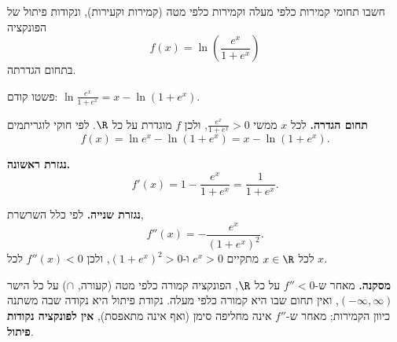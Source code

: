 
\begin{question}
חשבו תחומי קמירות כלפי מעלה וקמירות כלפי מטה (קמירות וקעירות), ונקודות פיתול של הפונקציה
\[ f(x)=\ln\left(\frac{e^x}{1+e^x}\right) \]
בתחום הגדרתה.
\end{question}

\begin{hint}
פשטו קודם: $\ln\frac{e^x}{1+e^x}=x-\ln(1+e^x)$.
\end{hint}

\begin{solution}
\textbf{תחום הגדרה.} לכל $x$ ממשי $\frac{e^x}{1+e^x}>0$, ולכן $f$ מוגדרת על כל $\R$. לפי חוקי לוגריתמים
\[ f(x)=\ln e^x-\ln(1+e^x)=x-\ln(1+e^x). \]

\textbf{נגזרת ראשונה.}
\[ f'(x)=1-\frac{e^x}{1+e^x}=\frac{1}{1+e^x}. \]

\textbf{נגזרת שנייה.} לפי כלל השרשרת,
\[ f''(x)=-\frac{e^x}{(1+e^x)^2}. \]
לכל $x\in\R$ מתקיים $e^x>0$ ו-$(1+e^x)^2>0$, ולכן $f''(x)<0$ לכל $x$.

\textbf{מסקנה.} מאחר ש-$f''<0$ על כל $\R$, הפונקציה קמורה כלפי מטה (קעורה, $\cap$) על כל הישר $(-\infty,\infty)$, ואין תחום שבו היא קמורה כלפי מעלה. נקודת פיתול היא נקודה שבה משתנה כיוון הקמירות; מאחר ש-$f''$ אינה מחליפה סימן (ואף אינה מתאפסת), \textbf{אין לפונקציה נקודות פיתול}.
\end{solution}
